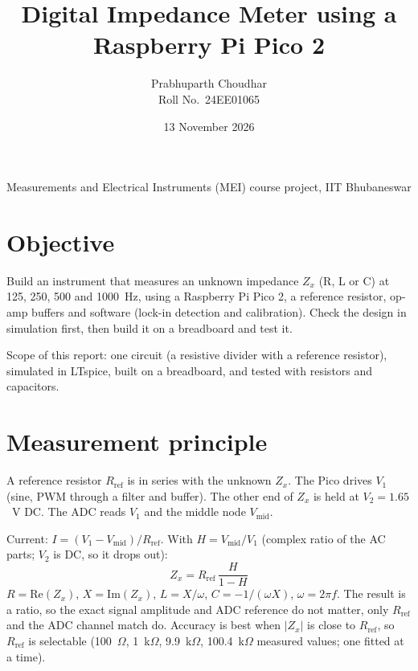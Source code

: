 \documentclass[11pt,a4paper]{article}
\title{Digital Impedance Meter using a Raspberry Pi Pico 2}
\author{Prabhuparth Choudhar \\ Roll No.\ 24EE01065}
\date{13 November 2026}
\newcommand{\Rref}{R_{\mathrm{ref}}}
\newcommand{\Zx}{Z_x}
\newcommand{\Vmid}{V_{\mathrm{mid}}}
\begin{document}
\maketitle
\noindent Measurements and Electrical Instruments (MEI) course project, IIT Bhubaneswar

\section{Objective}
Build an instrument that measures an unknown impedance $\Zx$ (R, L or C) at 125, 250, 500 and 1000~Hz, using a Raspberry Pi Pico 2, a reference resistor, op-amp buffers and software (lock-in detection and calibration). Check the design in simulation first, then build it on a breadboard and test it.

Scope of this report: one circuit (a resistive divider with a reference resistor), simulated in LTspice, built on a breadboard, and tested with resistors and capacitors.

\section{Measurement principle}
A reference resistor $\Rref$ is in series with the unknown $\Zx$. The Pico drives $V_1$ (sine, PWM through a filter and buffer). The other end of $\Zx$ is held at $V_2 = 1.65$~V DC. The ADC reads $V_1$ and the middle node $\Vmid$.

Current: $I = (V_1 - \Vmid)/\Rref$. With $H = \Vmid / V_1$ (complex ratio of the AC parts; $V_2$ is DC, so it drops out):
\begin{equation}
  \Zx = \Rref \, \frac{H}{1-H}
\end{equation}
$R = \mathrm{Re}(\Zx)$, $X = \mathrm{Im}(\Zx)$, $L = X/\omega$, $C = -1/(\omega X)$, $\omega = 2\pi f$. The result is a ratio, so the exact signal amplitude and ADC reference do not matter, only $\Rref$ and the ADC channel match do. Accuracy is best when $|\Zx|$ is close to $\Rref$, so $\Rref$ is selectable (100~$\Omega$, 1~k$\Omega$, 9.9~k$\Omega$, 100.4~k$\Omega$ measured values; one fitted at a time).
\end{document}

